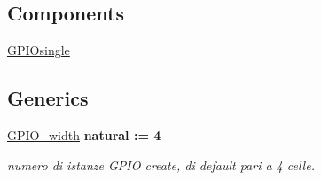 \subsection*{Components}
 \begin{DoxyCompactItemize}
\item 
\hypertarget{group___g_p_i_o-array_ga1ef3f8a153dc3cf7c70b202d716ca7af}{\hyperlink{group___g_p_i_o-array_ga1ef3f8a153dc3cf7c70b202d716ca7af}{G\+P\+I\+Osingle}  {\bfseries }  }\label{group___g_p_i_o-array_ga1ef3f8a153dc3cf7c70b202d716ca7af}

\end{DoxyCompactItemize}
\subsection*{Generics}
 \begin{DoxyCompactItemize}
\item 
\hypertarget{group___g_p_i_o-array_ga0b52ca75e9a6093b2b60d5e851803069}{\hyperlink{group___g_p_i_o-array_ga0b52ca75e9a6093b2b60d5e851803069}{G\+P\+I\+O\+\_\+width} {\bfseries {\bfseries \textcolor{vhdlchar}{natural}\textcolor{vhdlchar}{ }\textcolor{vhdlchar}{ }\textcolor{vhdlchar}{\+:}\textcolor{vhdlchar}{=}\textcolor{vhdlchar}{ }\textcolor{vhdlchar}{ } \textcolor{vhdldigit}{4} \textcolor{vhdlchar}{ }}}}\label{group___g_p_i_o-array_ga0b52ca75e9a6093b2b60d5e851803069}

\begin{DoxyCompactList}\small\item\em numero di istanze G\+P\+I\+O create, di default pari a 4 celle. \end{DoxyCompactList}\end{DoxyCompactItemize}
